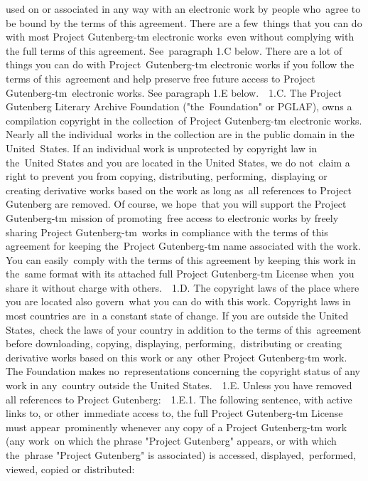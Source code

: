 {used on or associated in any way with an electronic work by people who\
agree to be bound by the terms of this agreement. There are a few\
things that you can do with most Project Gutenberg-tm electronic works\
even without complying with the full terms of this agreement. See\
paragraph 1.C below. There are a lot of things you can do with Project\
Gutenberg-tm electronic works if you follow the terms of this\
agreement and help preserve free future access to Project Gutenberg-tm\
electronic works. See paragraph 1.E below.\
\
1.C. The Project Gutenberg Literary Archive Foundation ("the\
Foundation" or PGLAF), owns a compilation copyright in the collection\
of Project Gutenberg-tm electronic works. Nearly all the individual\
works in the collection are in the public domain in the United\
States. If an individual work is unprotected by copyright law in the\
United States and you are located in the United States, we do not\
claim a right to prevent you from copying, distributing, performing,\
displaying or creating derivative works based on the work as long as\
all references to Project Gutenberg are removed. Of course, we hope\
that you will support the Project Gutenberg-tm mission of promoting\
free access to electronic works by freely sharing Project Gutenberg-tm\
works in compliance with the terms of this agreement for keeping the\
Project Gutenberg-tm name associated with the work. You can easily\
comply with the terms of this agreement by keeping this work in the\
same format with its attached full Project Gutenberg-tm License when\
you share it without charge with others.\
\
1.D. The copyright laws of the place where you are located also govern\
what you can do with this work. Copyright laws in most countries are\
in a constant state of change. If you are outside the United States,\
check the laws of your country in addition to the terms of this\
agreement before downloading, copying, displaying, performing,\
distributing or creating derivative works based on this work or any\
other Project Gutenberg-tm work. The Foundation makes no\
representations concerning the copyright status of any work in any\
country outside the United States.\
\
1.E. Unless you have removed all references to Project Gutenberg:\
\
1.E.1. The following sentence, with active links to, or other\
immediate access to, the full Project Gutenberg-tm License must appear\
prominently whenever any copy of a Project Gutenberg-tm work (any work\
on which the phrase "Project Gutenberg" appears, or with which the\
phrase "Project Gutenberg" is associated) is accessed, displayed,\
performed, viewed, copied or distributed:\
}
